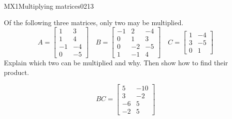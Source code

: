 \newpage




\begin{exercise}{MX1}{Multiplying matrices}{0213} 
\begin{exerciseStatement} 

Of the following three matrices, only two may be multiplied. \[
          A=\left[\begin{array}{cc}
1 & 3 \\
1 & 4 \\
-1 & -4 \\
0 & -5
\end{array}\right] \hspace{1em} B=\left[\begin{array}{ccc}
-1 & 2 & -4 \\
0 & 1 & 3 \\
0 & -2 & -5 \\
1 & -1 & 4
\end{array}\right] \hspace{1em} C=\left[\begin{array}{cc}
1 & -4 \\
3 & -5 \\
0 & 1
\end{array}\right]
      \] Explain which two can be multiplied and why. Then show how to find their product.

 \end{exerciseStatement}
 \begin{exerciseAnswer} \[BC=\left[\begin{array}{cc}
5 & -10 \\
3 & -2 \\
-6 & 5 \\
-2 & 5
\end{array}\right]\] \end{exerciseAnswer}
 \end{exercise}



